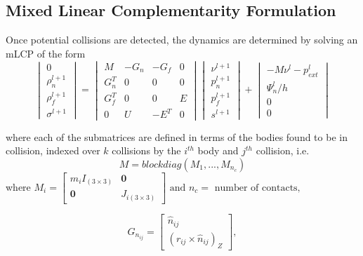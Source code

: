 \documentclass{article}
\begin{document}
\subsection{Mixed Linear Complementarity Formulation}
Once potential collisions are detected, the dynamics are determined by solving an mLCP of the form
\begin{equation}
\begin{vmatrix}
0 \\ \rho_{n}^{l+1} \\ \rho_{f}^{l+1} \\ \sigma^{l+1} 
\end{vmatrix} =
\begin{vmatrix} 
M & -G_{n} & -G_{f} & 0 \\
G_{n}^{T} & 0 & 0 & 0 \\
G_{f}^{T} & 0 & 0 & E \\
0 & U & -E^{T} & 0
 \end{vmatrix} 
\begin{vmatrix}
\nu^{l+1} \\
p_{n}^{l+1} \\
p_{f}^{l+1} \\
s^{l+1}
\end{vmatrix} + 
\begin{vmatrix}
-M\nu^{l}-p_{ext}^{l} \\
\Psi_{n}^{l}/h \\
0 \\
0
\end{vmatrix}
\end{equation}


where each of the submatrices are defined in terms of the bodies found to be in collision, indexed over $k$ collisions by the $i^{th}$ body and $j^{th}$ collision, i.e.\\
\begin{equation}
M = blockdiag(M_1,...,M_{n_c})
\nonumber
\end{equation} 
where 
$M_i = \begin{bmatrix} m_iI_{(3\times3)} & \mathbf{0} \\ \mathbf{0} & J_{i (3\times3)}  \end{bmatrix}
\text{ and } n_c = \text{ number of contacts, }$

\begin{equation}
G_{n_{ij}} = \begin{bmatrix} 
\hat{n}_{ij}  \\ 
(r_{ij} \times \hat{n}_{ij})_{Z}
\end{bmatrix},  \nonumber
\end{equation}
\end{document}
